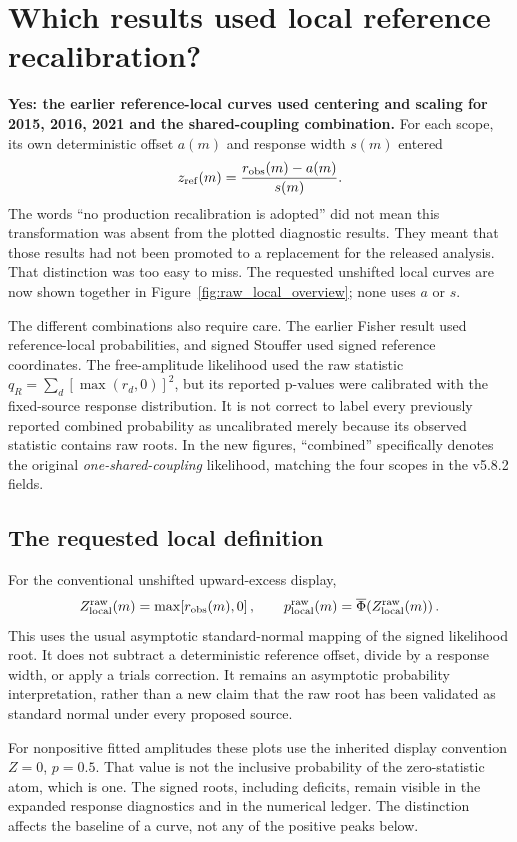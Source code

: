 \section{Which results used local reference recalibration?}
\textbf{Yes: the earlier reference-local curves used centering and scaling for 2015, 2016, 2021 and the shared-coupling combination.} For each scope, its own deterministic offset $a(m)$ and response width $s(m)$ entered
\[
 z_{\rm ref}(m)=\frac{r_{\rm obs}(m)-a(m)}{s(m)}.
\]
The words ``no production recalibration is adopted'' did not mean this transformation was absent from the plotted diagnostic results. They meant that those results had not been promoted to a replacement for the released analysis. That distinction was too easy to miss. The requested unshifted local curves are now shown together in Figure~\ref{fig:raw_local_overview}; none uses $a$ or $s$.

The different combinations also require care. The earlier Fisher result used reference-local probabilities, and signed Stouffer used signed reference coordinates. The free-amplitude likelihood used the raw statistic $q_R=\sum_d[\max(r_d,0)]^2$, but its reported p-values were calibrated with the fixed-source response distribution. It is not correct to label every previously reported combined probability as uncalibrated merely because its observed statistic contains raw roots. In the new figures, ``combined'' specifically denotes the original \emph{one-shared-coupling} likelihood, matching the four scopes in the v5.8.2 fields.

\subsection{The requested local definition}
For the conventional unshifted upward-excess display,
\[
 Z_{\rm local}^{\rm raw}(m)=\max\!\left[r_{\rm obs}(m),0\right],
 \qquad p_{\rm local}^{\rm raw}(m)=\overline\Phi\!\left(Z_{\rm local}^{\rm raw}(m)\right).
\]
This uses the usual asymptotic standard-normal mapping of the signed likelihood root. It does not subtract a deterministic reference offset, divide by a response width, or apply a trials correction. It remains an asymptotic probability interpretation, rather than a new claim that the raw root has been validated as standard normal under every proposed source.

For nonpositive fitted amplitudes these plots use the inherited display convention $Z=0$, $p=0.5$. That value is not the inclusive probability of the zero-statistic atom, which is one. The signed roots, including deficits, remain visible in the expanded response diagnostics and in the numerical ledger. The distinction affects the baseline of a curve, not any of the positive peaks below.


